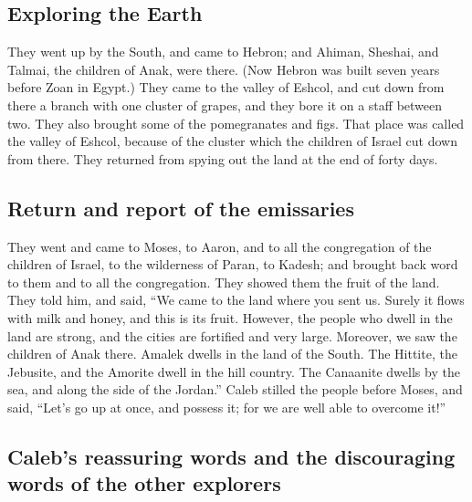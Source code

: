 \hypertarget{exploring-the-earth}{%
\subsection{Exploring the Earth}\label{exploring-the-earth}}

 They went up by the South, and came to Hebron; and
Ahiman, Sheshai, and Talmai, the children of Anak, were there. (Now
Hebron was built seven years before Zoan in Egypt.)  They
came to the valley of Eshcol, and cut down from there a branch with one
cluster of grapes, and they bore it on a staff between two. They also
brought some of the pomegranates and figs.  That place
was called the valley of Eshcol, because of the cluster which the
children of Israel cut down from there.  They returned
from spying out the land at the end of forty days.

\hypertarget{return-and-report-of-the-emissaries}{%
\subsection{Return and report of the
emissaries}\label{return-and-report-of-the-emissaries}}

 They went and came to Moses, to Aaron, and to all the
congregation of the children of Israel, to the wilderness of Paran, to
Kadesh; and brought back word to them and to all the congregation. They
showed them the fruit of the land.  They told him, and
said, ``We came to the land where you sent us. Surely it flows with milk
and honey, and this is its fruit.  However, the people
who dwell in the land are strong, and the cities are fortified and very
large. Moreover, we saw the children of Anak there. 
Amalek dwells in the land of the South. The Hittite, the Jebusite, and
the Amorite dwell in the hill country. The Canaanite dwells by the sea,
and along the side of the Jordan.''  Caleb stilled the
people before Moses, and said, ``Let's go up at once, and possess it;
for we are well able to overcome it!''

\hypertarget{calebs-reassuring-words-and-the-discouraging-words-of-the-other-explorers}{%
\subsection{Caleb's reassuring words and the discouraging words of the
other
explorers}\label{calebs-reassuring-words-and-the-discouraging-words-of-the-other-explorers}}

